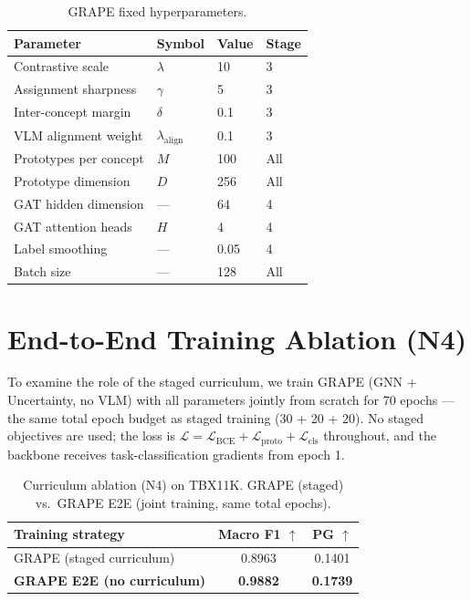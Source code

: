 \documentclass{article}
\begin{document}
\begin{table}[h]
  \caption{GRAPE fixed hyperparameters.}
  \label{tab:hparams_fixed}
  \centering
  \begin{tabular}{llll}
    \toprule
    Parameter & Symbol & Value & Stage \\
    \midrule
    Contrastive scale         & $\lambda$          & 10   & 3 \\
    Assignment sharpness      & $\gamma$           & 5    & 3 \\
    Inter-concept margin      & $\delta$           & 0.1  & 3 \\
    VLM alignment weight      & $\lambda_\text{align}$ & 0.1 & 3 \\
    Prototypes per concept    & $M$                & 100  & All \\
    Prototype dimension       & $D$                & 256  & All \\
    GAT hidden dimension      & —                  & 64   & 4 \\
    GAT attention heads       & $H$                & 4    & 4 \\
    Label smoothing           & —                  & 0.05 & 4 \\
    Batch size                & —                  & 128  & All \\
    \bottomrule
  \end{tabular}
\end{table}

\section{End-to-End Training Ablation (N4)}
\label{app:n4}

To examine the role of the staged curriculum, we train GRAPE (GNN + Uncertainty, no VLM) with all parameters jointly from scratch for 70 epochs — the same total epoch budget as staged training (30 + 20 + 20).
No staged objectives are used; the loss is $\mathcal{L} = \mathcal{L}_\text{BCE} + \mathcal{L}_\text{proto} + \mathcal{L}_\text{cls}$ throughout, and the backbone receives task-classification gradients from epoch 1.

\begin{table}[h]
  \caption{Curriculum ablation (N4) on TBX11K. GRAPE (staged) vs.\ GRAPE E2E (joint training, same total epochs).}
  \label{tab:n4}
  \centering
  \begin{tabular}{lcc}
    \toprule
    Training strategy & Macro F1 $\uparrow$ & PG $\uparrow$ \\
    \midrule
    GRAPE (staged curriculum) & 0.8963 & 0.1401 \\
    \textbf{GRAPE E2E (no curriculum)} & \textbf{0.9882} & \textbf{0.1739} \\
    \bottomrule
  \end{tabular}
\end{table}
\end{document}

